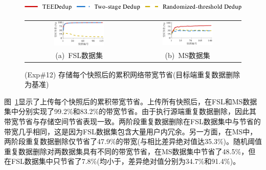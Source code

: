 \begin{figure}[!htb]
    \centering
    \includegraphics[height=11pt]{pic/sgxdedup/plot/upload_traffic/upload_traffic_legend.pdf}
    \begin{tabular}{@{\ }c@{\ }c}
        \includegraphics[width=0.49\textwidth]{pic/sgxdedup/plot/upload_traffic/upload_traffic_fsl.pdf} & 
        \includegraphics[width=0.49\textwidth]{pic/sgxdedup/plot/upload_traffic/upload_traffic_ms.pdf}     \\ 
        \mbox{\small (a) FSL数据集}                                                                     & 
        \mbox{\small (b) MS数据集}
    \end{tabular}
    \caption{(Exp\#12) 存储每个快照后的累积网络带宽节省(目标端重复数据删除为基准)}
    \label{fig:sgxdedup-uploadTraffic}
\end{figure}

图~\ref{fig:sgxdedup-uploadTraffic}显示了上传每个快照后的累积带宽节省。上传所有快照后，\sysnameS 在FSL和MS数据集中分别实现了99.2\%和83.2\%的带宽节省。由于\sysnameS 执行源端重复数据删除，因此其带宽节省与存储空间节省表现一致。两阶段重复数据删除在FSL数据集中与\sysnameS 节省的带宽几乎相同，这是因为FSL数据集包含大量用户内冗余。另一方面，在MS中，两阶段重复数据删除仅节省了47.9\%的带宽(与\sysnameS 相比差异绝对值达35.3\%)。随机阈值重复数据删除对两数据集具有不同的带宽节省，在MS数据集中节省了48.5\%，但在FSL数据集中只节省了7.8\%(均小于\sysnameS，差异绝对值分别为34.7\%和91.4\%)。

